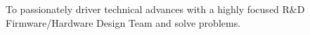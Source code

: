 
\vspace{-1cm}\reversemarginpar {}
\noindent To passionately driver technical advances with a highly focused R\&D Firmware/Hardware Design Team and solve problems.
\\
